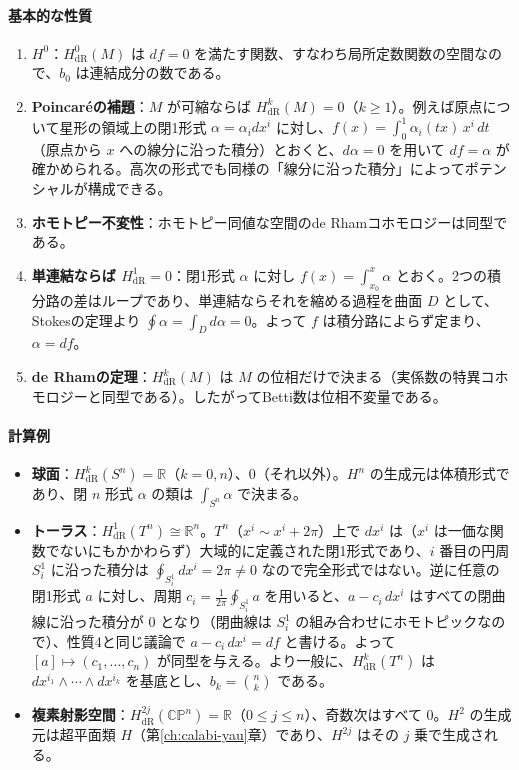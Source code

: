 \documentclass[uplatex, dvipdfmx, book]{jsbook}
\begin{document}
\paragraph{基本的な性質}
\begin{enumerate}
    \item \textbf{$H^0$}：$H^0_{\mathrm{dR}}(M)$ は $df = 0$ を満たす関数、すなわち局所定数関数の空間なので、$b_0$ は連結成分の数である。
    \item \textbf{Poincar\'eの補題}：$M$ が可縮ならば $H^k_{\mathrm{dR}}(M) = 0$（$k \ge 1$）。例えば原点について星形の領域上の閉1形式 $\alpha = \alpha_i dx^i$ に対し、$f(x) = \int_0^1 \alpha_i(tx)\, x^i\, dt$（原点から $x$ への線分に沿った積分）とおくと、$d\alpha = 0$ を用いて $df = \alpha$ が確かめられる。高次の形式でも同様の「線分に沿った積分」によってポテンシャルが構成できる。
    \item \textbf{ホモトピー不変性}：ホモトピー同値な空間のde Rhamコホモロジーは同型である。
    \item \textbf{単連結ならば $H^1_{\mathrm{dR}} = 0$}：閉1形式 $\alpha$ に対し $f(x) = \int_{x_0}^x \alpha$ とおく。2つの積分路の差はループであり、単連結ならそれを縮める過程を曲面 $D$ として、Stokesの定理より $\oint \alpha = \int_D d\alpha = 0$。よって $f$ は積分路によらず定まり、$\alpha = df$。
    \item \textbf{de Rhamの定理}：$H^k_{\mathrm{dR}}(M)$ は $M$ の位相だけで決まる（実係数の特異コホモロジーと同型である）。したがってBetti数は位相不変量である。
\end{enumerate}

\paragraph{計算例}
\begin{itemize}
    \item \textbf{球面}：$H^k_{\mathrm{dR}}(S^n) = \mathbb{R}$（$k = 0, n$）、$0$（それ以外）。$H^n$ の生成元は体積形式であり、閉 $n$ 形式 $\alpha$ の類は $\int_{S^n}\alpha$ で決まる。
    \item \textbf{トーラス}：$H^1_{\mathrm{dR}}(T^n) \cong \mathbb{R}^n$。$T^n$（$x^i \sim x^i + 2\pi$）上で $dx^i$ は（$x^i$ は一価な関数でないにもかかわらず）大域的に定義された閉1形式であり、$i$ 番目の円周 $S^1_i$ に沿った積分は $\oint_{S^1_i} dx^i = 2\pi \neq 0$ なので完全形式ではない。逆に任意の閉1形式 $a$ に対し、周期 $c_i = \frac{1}{2\pi}\oint_{S^1_i} a$ を用いると、$a - c_i\,dx^i$ はすべての閉曲線に沿った積分が $0$ となり（閉曲線は $S^1_i$ の組み合わせにホモトピックなので）、性質4と同じ議論で $a - c_i\,dx^i = df$ と書ける。よって $[a] \mapsto (c_1, \dots, c_n)$ が同型を与える。より一般に、$H^k_{\mathrm{dR}}(T^n)$ は $dx^{i_1} \wedge \cdots \wedge dx^{i_k}$ を基底とし、$b_k = \binom{n}{k}$ である。
    \item \textbf{複素射影空間}：$H^{2j}_{\mathrm{dR}}(\mathbb{CP}^n) = \mathbb{R}$（$0 \le j \le n$）、奇数次はすべて $0$。$H^2$ の生成元は超平面類 $H$（第\ref{ch:calabi-yau}章）であり、$H^{2j}$ はその $j$ 乗で生成される。
\end{itemize}
\end{document}
